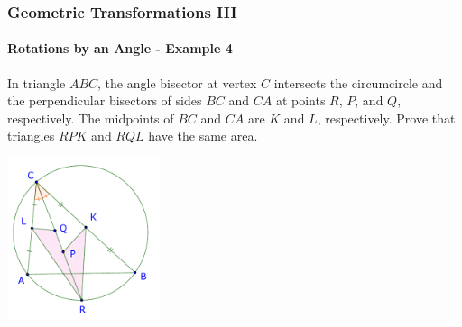 \documentclass[8pt,xcolor=table,dvipsnames]{beamer}
\begin{document}
\begin{frame}[t]
    \frametitle{Geometric Transformations III}
    \framesubtitle{Rotations by an Angle - Example 4}
    \begin{example}
        In triangle $ABC$, the angle bisector at vertex $C$ intersects the circumcircle
        and the perpendicular bisectors of sides $BC$ and $CA$ at points $R$, $P$, and $Q$, respectively.
        The midpoints of $BC$ and $CA$ are $K$ and $L$, respectively.
        \bigbreak
        Prove that triangles $RPK$ and $RQL$ have the same area.
    \end{example}

    \begin{center}
        \includegraphics[width=4.5cm]{./svg/pdf/imo-2007-4.pdf}
    \end{center}
\end{frame}
\end{document}

